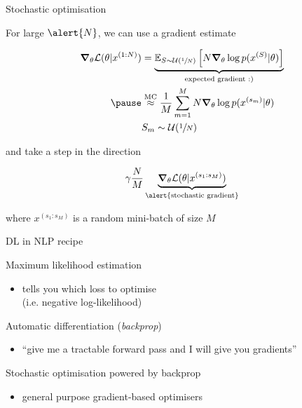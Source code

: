 \documentclass[14pt]{beamer}
\begin{document}
\begin{frame}{Stochastic optimisation}


For large $\alert{N}$, we can use a gradient estimate 
\begin{small}
\begin{equation*}
\begin{aligned}
\grad_\theta \mathcal L(\theta|x^{(1:N)}) 
 &=  \underbrace{\mathbb E_{S\sim \mathcal U(\sfrac{1}{N})}\left[ N \grad_\theta  \log p(x^{(S)}|\theta)\right]}_{\text{expected gradient :)}} \\ \pause
 &\overset{\text{MC}}{\approx} \frac{1}{M} \sum_{m=1}^M N  \grad_\theta \log p(x^{(s_m)}|\theta) \\
 &S_m \sim \mathcal U(\sfrac{1}{N})
\end{aligned}
\end{equation*}
\end{small}  \pause
and take a step in the direction
\begin{small}
\begin{equation*}
\gamma \frac{N}{M} \underbrace{\grad_\theta \mathcal L(\theta|x^{(s_1:s_M)})}_{\text{\alert{stochastic gradient}}}
\end{equation*}
\end{small}
where $x^{(s_1:s_M)}$ is a random mini-batch of size $M$


\end{frame}




\begin{frame}{DL in NLP recipe}



	Maximum likelihood estimation
	\begin{itemize}
		\item  tells you which \alert{loss} to optimise \\
		(i.e. negative log-likelihood)
	\end{itemize}
	
	Automatic differentiation (\emph{backprop})
	\begin{itemize}
		\item ``give me a tractable forward pass and I will give you \alert{gradients}''
	\end{itemize}
	
	Stochastic optimisation powered by backprop
	\begin{itemize}
		\item general purpose gradient-based optimisers
	\end{itemize}

\end{frame}
\end{document}
